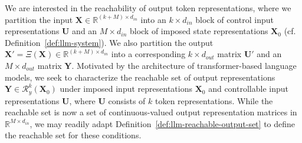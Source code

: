 \documentclass{article} %
\begin{document}
We are interested in the reachability of output token representations, where we partition the input $\mathbf X \in \mathbb R^{(k + M)\times d_{in}}$ into an $k \times d_{in}$ block of control input representations $\mathbf U$ and an $M\times d_{in}$ block of imposed state representations $\mathbf X_0$ (cf. Definition~\ref{def:llm-system}). 
We also partition the output $\mathbf X' = \Xi (\mathbf X)\in \mathbb R^{(k+M)\times d_{in}}$ into a corresponding $k\times d_{out}$ matrix $\mathbf U'$ and an $M\times d_{out}$ matrix $\mathbf Y$. 
Motivated by the architecture of transformer-based language models, we seek to characterize the reachable set of output representations $\mathbf Y \in \mathcal R_y^k(\mathbf X_0)$ under imposed input representations $\mathbf X_0$ and controllable input representations $\mathbf U$, where $\mathbf U$ consists of $k$ token representations. 
While the reachable set is now a set of continuous-valued output representation matrices in $\mathbb R^{M\times d_{in}}$, we may readily adapt Definition~\ref{def:llm-reachable-output-set} to define the reachable set for these conditions.  
\end{document}
